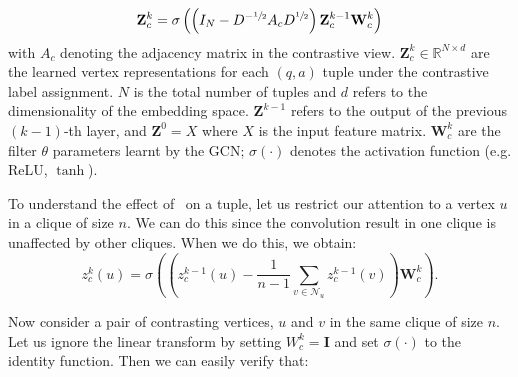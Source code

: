 \begin{equation}
  \label{eq:contrast}
  \mathbf{Z}_c^{k} = \sigma \left( \left (I_N - D^{-\sfrac{1}{2}}A_cD^{\sfrac{1}{2}} \right) \mathbf{Z}_c^{k-1} \mathbf{W}_c^{k}\right)
\end{equation}
with $A_c$ denoting the adjacency matrix in the contrastive view. $\mathbf{Z}_c^{k} \in \mathbb{R}^{N \times d}$ are the learned vertex representations for each $(q,a)$ tuple under the contrastive label assignment. $N$ is the total number of tuples and $d$ refers to the dimensionality of the embedding space. $\mathbf{Z}^{k-1}$ refers to the output of the previous $(k-1)$-{th} layer, and $\mathbf{Z}^{0} = X$ where $X$ is the input feature matrix. $\mathbf{W}_c^{k}$ are the filter $\theta$ parameters learnt by the GCN; $\sigma( \cdot)$ denotes the activation function (e.g. ReLU, $\tanh$).


To understand the effect of~ on a tuple, let us restrict our attention to a vertex $u$ in a clique of size $n$. We can do this since the convolution result in one clique is unaffected by other cliques. When we do this, we obtain:
\begin{equation}
  z_c^{k}(u) = \sigma \left(\left(z_c^{k-1}(u) - \frac{1}{n-1} \sum_{v \in \mathcal{N}_u} z_c^{k-1}(v) \right) \mathbf{W}_{c}^{k}\right). \label{eq:contrastrestrict}
  \end{equation}

Now consider a pair of contrasting vertices, $u$ and $v$ in the same clique of size $n$. Let us ignore the linear transform by setting $W_{c}^{k}=\mathbf{I}$ and set $\sigma(\cdot)$ to the identity function. Then we can easily verify that:

